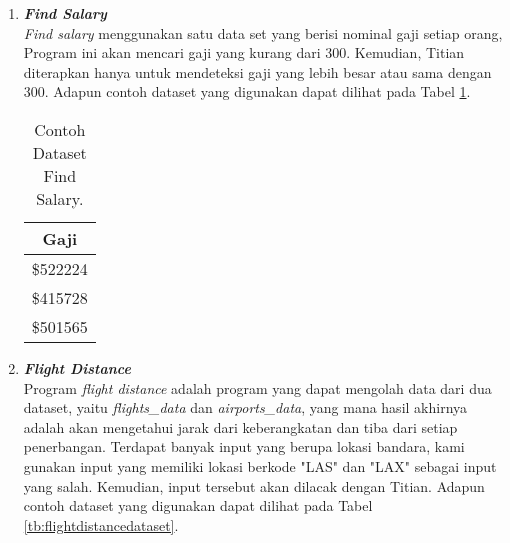 \begin{enumerate}
      \item \emph{\textbf{Find Salary}} \\
            \emph{Find salary} menggunakan satu data set yang berisi nominal gaji setiap orang, Program ini akan mencari gaji yang kurang dari 300. Kemudian, Titian diterapkan hanya untuk mendeteksi gaji yang lebih besar atau sama dengan 300.
            Adapun contoh dataset yang digunakan dapat 
            dilihat pada Tabel \ref{tb:findsalarydataset}.

            \begin{longtable}{|c|}
                  \caption{Contoh Dataset Find Salary.}
                  \label{tb:findsalarydataset} \\
                  \hline
                  \rowcolor[HTML]{C0C0C0}
                  \textbf{Gaji} \\
                  \hline
                  \$522224 \\
                  \$415728 \\
                  \$501565 \\
                  \hline
            \end{longtable}

      \item \emph{\textbf{Flight Distance}} \\
            Program \emph{flight distance} adalah program yang dapat mengolah data dari dua dataset, yaitu \emph{flights\_data} dan \emph{airports\_data}, yang mana hasil akhirnya adalah akan mengetahui jarak dari keberangkatan dan tiba dari setiap penerbangan. 
            Terdapat banyak input yang berupa lokasi bandara, kami gunakan input yang memiliki lokasi berkode "LAS" dan "LAX" sebagai input yang salah. Kemudian, input tersebut akan dilacak dengan Titian.
            Adapun contoh dataset yang digunakan dapat 
            dilihat pada Tabel \ref{tb:flightdistancedataset}.


\end{enumerate}
